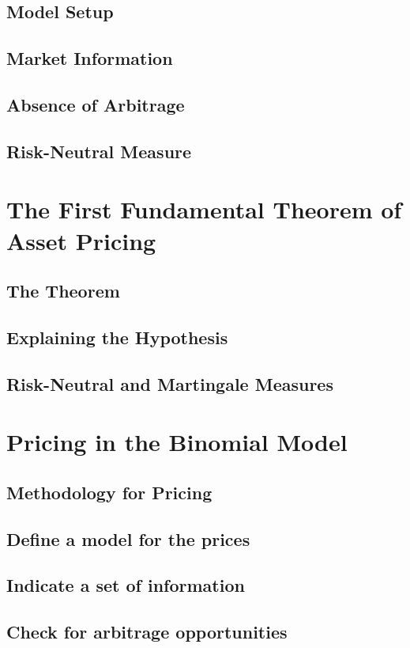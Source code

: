 \documentclass{beamer}
\begin{document}
\subsection{Model Setup}
\subsection{Market Information}
\subsection{Absence of Arbitrage}
\subsection{Risk-Neutral Measure}

\section{The First Fundamental Theorem of Asset Pricing}
\subsection{The Theorem}
\subsection{Explaining the Hypothesis}
\subsection{Risk-Neutral and Martingale Measures}

\section{Pricing in the Binomial Model}
\subsection{Methodology for Pricing}
\subsection{Define a model for the prices}
\subsection{Indicate a set of information}
\subsection{Check for arbitrage opportunities}
\end{document}
